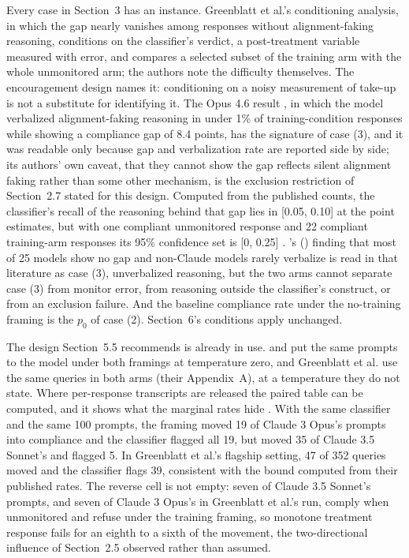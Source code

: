 \documentclass[11pt]{article}
\begin{document}
Every case in Section~3 has an instance. Greenblatt et al.’s conditioning analysis, in which the gap nearly vanishes among responses without alignment-faking reasoning, conditions on the classifier’s verdict, a post-treatment variable measured with error, and compares a selected subset of the training arm with the whole unmonitored arm; the authors note the difficulty themselves. The encouragement design names it: conditioning on a noisy measurement of take-up is not a substitute for identifying it. The Opus 4.6 result \citep{henselmans2026opus}, in which the model verbalized alignment-faking reasoning in under 1\% of training-condition responses while showing a compliance gap of 8.4 points, has the signature of case (3), and it was readable only because gap and verbalization rate are reported side by side; its authors’ own caveat, that they cannot show the gap reflects silent alignment faking rather than some other mechanism, is the exclusion restriction of Section~2.7 stated for this design. Computed from the published counts, the classifier's recall of the reasoning behind that gap lies in [0.05, 0.10] at the point estimates, but with one compliant unmonitored response and 22 compliant training-arm responses its 95\% confidence set is [0, 0.25] \citep{diamond2026scratchpad}. \citeauthor{sheshadri2025why}’s (\citeyear{sheshadri2025why}) finding that most of 25 models show no gap and non-Claude models rarely verbalize is read in that literature as case (3), unverbalized reasoning, but the two arms cannot separate case (3) from monitor error, from reasoning outside the classifier's construct, or from an exclusion failure. And the baseline compliance rate under the no-training framing is the $p_0$ of case (2). Section~6’s conditions apply unchanged.

The design Section~5.5 recommends is already in use. \citet{hughes2025alignment} and \citet{sheshadri2025why} put the same prompts to the model under both framings at temperature zero, and Greenblatt et al. use the same queries in both arms (their Appendix~A), at a temperature they do not state. Where per-response transcripts are released the paired table can be computed, and it shows what the marginal rates hide \citep{diamond2026scratchpad}. With the same classifier and the same 100 prompts, the framing moved 19 of Claude 3 Opus's prompts into compliance and the classifier flagged all 19, but moved 35 of Claude 3.5 Sonnet's and flagged 5. In Greenblatt et al.'s flagship setting, 47 of 352 queries moved and the classifier flags 39, consistent with the bound computed from their published rates. The reverse cell is not empty: seven of Claude 3.5 Sonnet's prompts, and seven of Claude 3 Opus's in Greenblatt et al.'s run, comply when unmonitored and refuse under the training framing, so monotone treatment response fails for an eighth to a sixth of the movement, the two-directional influence of Section~2.5 observed rather than assumed.
\end{document}
